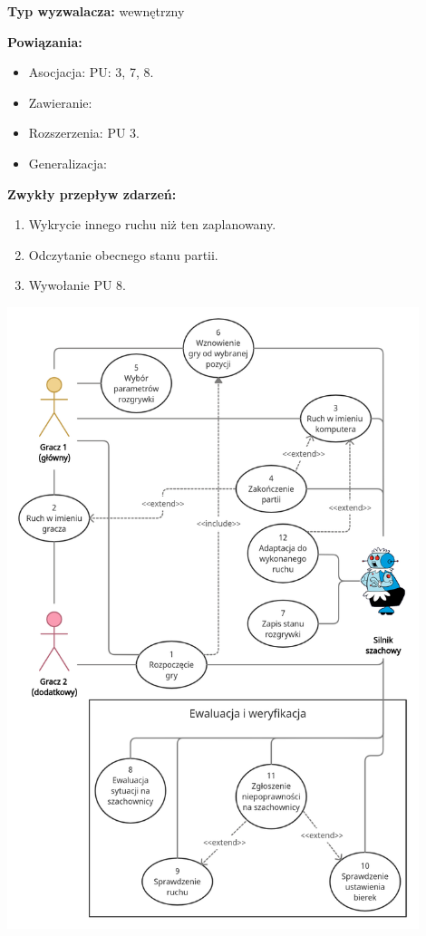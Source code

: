 \documentclass[12pt]{article}
\begin{document}
\textbf{Typ wyzwalacza:} wewnętrzny

\textbf{Powiązania:} 
	\begin{itemize}
	\item Asocjacja: PU: 3, 7, 8.
	\item Zawieranie: 
	\item Rozszerzenia: PU 3.
	\item Generalizacja:
\end{itemize} 

\textbf{Zwykły przepływ zdarzeń:}  
\begin{enumerate}
\item Wykrycie innego ruchu niż ten zaplanowany.
\item Odczytanie obecnego stanu partii. 
\item Wywołanie PU 8.
\end{enumerate} 




\centering
\includegraphics[width=0.9\textwidth]{diagram.png}
\end{document}
